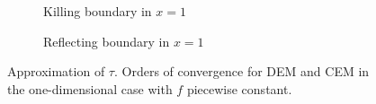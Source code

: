 \begin{figure}[t]
    \centering
    \begin{subfigure}{0.49\linewidth}
        \centering
        \resizebox{1\linewidth}{!}{ }  
        \caption{Killing boundary in $x = 1$}
        \label{fig:KillOneDRough}
    \end{subfigure}
    \begin{subfigure}{0.49\linewidth}
        \centering
        \resizebox{1\linewidth}{!}{ }  
        \caption{Reflecting boundary in $x = 1$}
        \label{fig:ReflectOneDRough}
    \end{subfigure}    
    \caption{Approximation of $\tau$. Orders of convergence for DEM and CEM in the one-dimensional case with $f$ piecewise constant.}
    \label{fig:OrdersOneDRough}
\end{figure}
